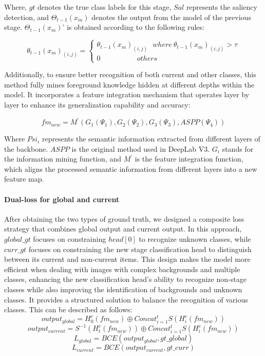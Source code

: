 Where, \(gt\) denotes the true class labels for this stage, \(Sal\) represents the saliency detection, and \( \Theta_{t-1}(x_{m})\) denotes the output from the model of the previous stage.  \( \Theta_{t-1}(x_{m})\)' is obtained according to the following rules:

\[\theta_{t-1}(x_m)_{(i,j)}=\begin{cases}\theta_{t-1}(x_m)_{(i,j)}~~~where~\theta_{t-1}(x_m)_{(i,j)}>\tau\\0~~~~~~~~~~~~~~~~~~~~~~~others\end{cases}\]

Additionally, to ensure better recognition of both current and other classes, this method fully mines foreground knowledge hidden at different depths within the model. It incorporates a feature integration mechanism that operates layer by layer to enhance its generalization capability and accuracy:

\begin{equation}
    {fm}_{{new}}={M}^{'}({G}_{1}(\Psi_{1}),G_{2}(\Psi_{2}),G_{3}(\Psi_{3}), ASPP(\Psi_{4}))
\end{equation}


Where $Psi_{i}$ represents the semantic information extracted from different layers of the backbone. $ASPP$ is the original method used in DeepLab V3. $G_{i}$ stands for the information mining function, and $M^{'}$ is the feature integration function, which aligns the processed semantic information from different layers into a new feature map.

\paragraph{Dual-loss for global and current}
After obtaining the two types of ground truth, we designed a composite loss strategy that combines global output and current output. In this approach, \(global\_gt\) focuses on constraining \(head[0]\) to recognize unknown classes, while \(curr\_gt\) focuses on constraining the new stage classification head to distinguish between its current and non-current items. This design makes the model more efficient when dealing with images with complex backgrounds and multiple classes, enhancing the new classification head's ability to recognize non-stage classes while also improving the identification of backgrounds and unknown classes. It provides a structured solution to balance the recognition of various classes. This can be described as follows:
\[output_{global}=H_0^c(fm_{new})\oplus Concat_{i=1}^tS(H_i^c(fm_{new}))\]
\[output_{current}=S^{-1}(H_t^c(fm_{new}))\oplus Concat_{i=1}^tS(H_i^c(fm_{new}))\]
\[L_{global}=BCE(output_{global},gt\_global)\]
\[L_{current}=BCE( output_{current} , gt\_curr)\]


